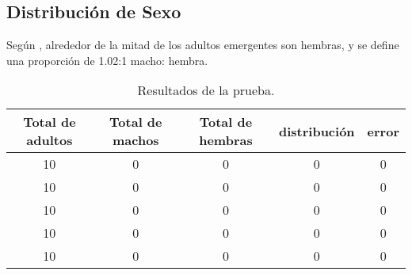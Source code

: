 \subsection{Distribución de Sexo}
Según \cite{otero2006stochastic}, alrededor de la mitad de los adultos emergentes son hembras, 
y se define una proporción de 1.02:1 macho: hembra.

\begin{table}
\begin{tabular}{c c c c c }
Total de adultos & Total de machos & Total de hembras & distribución & error\\
\hline
10  & 0  & 0 & 0 & 0   \\
10  & 0  & 0 & 0 & 0   \\
10  & 0  & 0 & 0 & 0   \\
10  & 0  & 0 & 0 & 0   \\
10  & 0  & 0 & 0 & 0   \\
\end{tabular}
\caption{ \label{tab:distribucion-sexo-test} Resultados de la prueba.}
\end{table}
